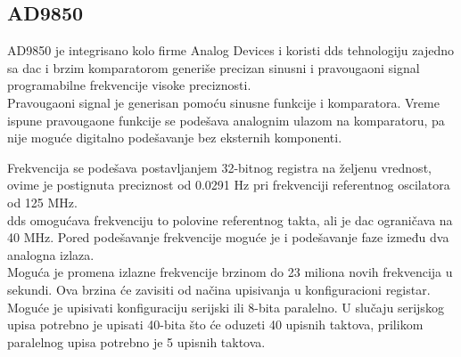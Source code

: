 \subsection{AD9850}

AD9850 je integrisano kolo firme Analog Devices i koristi \gls{dds} tehnologiju
zajedno sa \gls{dac} i brzim komparatorom generiše precizan sinusni i
pravougaoni signal programabilne frekvencije visoke preciznosti. \\
Pravougaoni signal je generisan pomoću sinusne funkcije i komparatora.
Vreme ispune pravougaone funkcije se podešava analognim ulazom na komparatoru,
pa nije moguće digitalno podešavanje bez eksternih komponenti. \\

\begin{figure}[H]
\end{figure}

Frekvencija se podešava postavljanjem 32-bitnog registra na željenu vrednost,
ovime je postignuta preciznost od 0.0291 Hz pri frekvenciji referentnog oscilatora od 125
MHz. \\
\gls{dds} omogućava frekvenciju to polovine referentnog takta, ali je \gls{dac}
ograničava na 40 MHz.
Pored podešavanje frekvencije moguće je i podešavanje faze između dva analogna
izlaza. \\

Moguća je promena izlazne frekvencije brzinom do 23 miliona
novih frekvencija u sekundi.
Ova brzina će zavisiti od načina upisivanja u konfiguracioni registar.
Moguće je upisivati konfiguraciju serijski ili 8-bita paralelno.
U slučaju serijskog upisa potrebno je upisati 40-bita što će oduzeti 40 upisnih
taktova, prilikom paralelnog upisa potrebno je 5 upisnih taktova. \\

